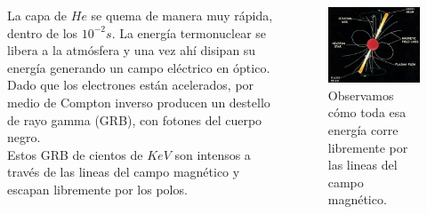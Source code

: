 \documentclass{beamer}
\begin{document}
\begin{frame}
	\begin{columns}
	
		\begin{column}{5cm}
		La capa de $He$ se quema de manera muy r\'apida, dentro de los $10^{-2}s$. La energ\'ia termonuclear
		se libera a la atm\'osfera y una vez ah\'i disipan su energ\'ia generando un campo el\'ectrico en \'optico.\\
		Dado que los electrones est\'an acelerados, por medio de Compton inverso producen un
		destello de rayo gamma (GRB), con fotones del cuerpo negro.\\
		Estos GRB de cientos de $KeV$ son intensos a trav\'es de las lineas del
		campo magn\'etico y escapan libremente por los polos.
		\end{column}	

		\begin{column}{5cm} 
			\begin{figure}
				\centering
				\includegraphics[scale=0.25]{expulsiondeljet.jpg}
				\caption{Observamos c\'omo toda esa energ\'ia corre libremente
				por las lineas del campo magn\'etico.}
			\end{figure}
		\end{column}	
	\end{columns}
\end{frame}


\end{document}
